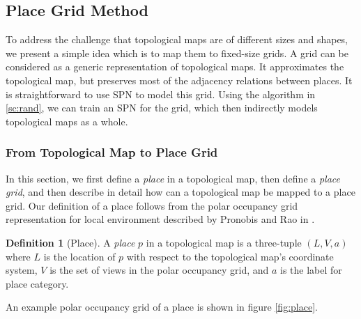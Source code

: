 \documentclass[10pt, titlepage]{article}
\theoremstyle{definition}
\newtheorem{definition}{Definition}[section]
\begin{document}
\subsection{Place Grid Method}\label{section:grid}
To address the challenge that topological maps are of different sizes and shapes, we present a simple idea which is to map them to fixed-size grids. A grid can be considered as a generic representation of topological maps. It approximates the topological map, but preserves most of the adjacency relations between places. It is straightforward to use SPN to model this grid. Using the algorithm in \ref{sc:rand}, we can train an SPN for the grid, which then indirectly models topological maps as a whole. 

\subsubsection{From Topological Map to Place Grid}

In this section, we first define a \textit{place} in a topological map, then define a \textit{place grid}, and then describe in detail how can a topological map be mapped to a place grid. Our definition of a place follows from the polar occupancy grid representation for local environment described by Pronobis and Rao in \cite{pronobis2016learning}.

\begin{definition}[Place]
A \textit{place} $p$ in a topological map is a three-tuple $(L, V, a)$ where $L$ is the location of $p$ with respect to the topological map's coordinate system, $V$ is the set of views in the polar occupancy grid, and $a$ is the label for place category.
\end{definition}

\noindent An example polar occupancy grid of a place is shown in figure \ref{fig:place}.
\end{document}
